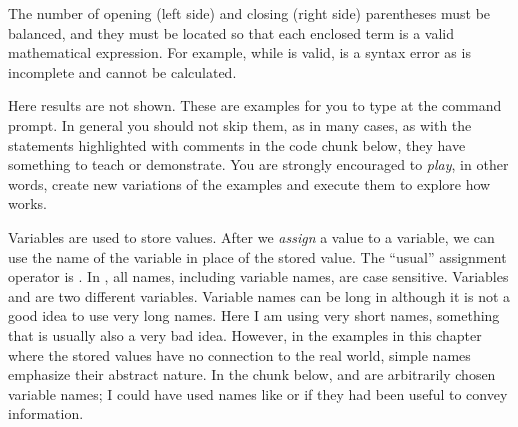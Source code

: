 \documentclass[krantz2]{krantz}\usepackage{knitr}
\begin{document}
The number of opening (left side) and closing (right side) parentheses must be balanced, and they must be located so that each enclosed term is a valid mathematical expression. For example, while  is valid,  is a syntax error as  is incomplete and cannot be calculated.

\begin{playground}
Here results are not shown. These are examples for you to type at the command prompt. In general you should not skip them, as in many cases, as with the statements highlighted with comments in the code chunk below, they have something to teach or demonstrate. You are strongly encouraged to \emph{play}, in other words, create new variations of the examples and execute them to explore how \Rlang works.

\begin{knitrout}\footnotesize
{}\color{fgcolor}\begin{kframe}
\begin{alltt}
 \hlopt{+} 
 \hlopt{*} 
 \hlopt{+}  \hlopt{/} 
\hlstd{(} \hlopt{+} \hlstd{)} \hlopt{/} 
\hlopt{^} \hlopt{+} 
\hlstd{(}\hlstd{)}
 
  \hlstd{=} \hlstd{)}
 
\hlstd{(}\hlstd{)}
\hlstd{(}\hlstd{)}
\hlstd{(}\hlstd{)}
\hlstd{(}\hlstd{)}
\end{alltt}
\end{kframe}
\end{knitrout}

\end{playground}

Variables are used to store values. After we \emph{assign} a value to a variable, we can use the name of the variable in place of the stored value. The ``usual'' assignment operator is \Roperator{<-}. In \Rlang, all names, including variable names, are case sensitive. Variables  and  are two different variables. Variable names can be long in \Rlang although it is not a good idea to use very long names. Here I am using very short names, something that is usually also a very bad idea. However, in the examples in this chapter where the stored values have no connection to the real world, simple names emphasize their abstract nature. In the chunk below,  and  are arbitrarily chosen variable names; I could have used names like  or  if they had been useful to convey information.
\end{document}
